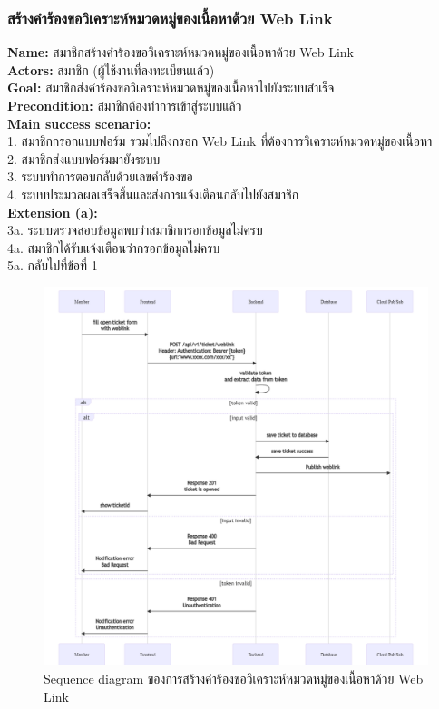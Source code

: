 \documentclass[12pt,oneside,openright,a4paper]{cpe-thai-project}
\begin{document}
\subsubsection{สร้างคำร้องขอวิเคราะห์หมวดหมู่ของเนื้อหาด้วย Web Link}
\textbf{Name: }สมาชิกสร้างคำร้องขอวิเคราะห์หมวดหมู่ของเนื้อหาด้วย Web Link \\
\textbf{Actors: }สมาชิก (ผู้ใช้งานที่ลงทะเบียนแล้ว) \\
\textbf{Goal: }สมาชิกส่งคำร้องขอวิเคราะห์หมวดหมู่ของเนื้อหาไปยังระบบสำเร็จ \\
\textbf{Precondition: }สมาชิกต้องทำการเข้าสู่ระบบแล้ว \\
\textbf{Main success scenario: } \\
  \hspace*{0.5cm}1. สมาชิกกรอกแบบฟอร์ม รวมไปถึงกรอก Web Link ที่ต้องการวิเคราะห์หมวดหมู่ของเนื้อหา \\
  \hspace*{0.5cm}2. สมาชิกส่งแบบฟอร์มมายังระบบ \\
  \hspace*{0.5cm}3. ระบบทำการตอบกลับด้วยเลขคำร้องขอ \\
  \hspace*{0.5cm}4. ระบบประมวลผลเสร็จสิ้นและส่งการแจ้งเตือนกลับไปยังสมาชิก \\
\textbf{Extension (a): } \\
  \hspace*{0.5cm}3a. ระบบตรวจสอบข้อมูลพบว่าสมาชิกกรอกข้อมูลไม่ครบ \\
  \hspace*{0.5cm}4a. สมาชิกได้รับแจ้งเตือนว่ากรอกข้อมูลไม่ครบ \\
  \hspace*{0.5cm}5a. กลับไปที่ข้อที่ 1 \newpage
\begin{figure}[!ht]\centering
  \includegraphics[width=\textwidth]{./img/seq_weblink.png}
  \caption{Sequence diagram ของการสร้างคำร้องขอวิเคราะห์หมวดหมู่ของเนื้อหาด้วย Web Link}\label{fig:seq_weblink} 
\end{figure} 
\end{document}
